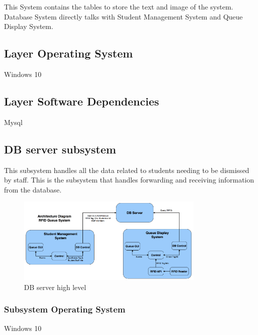 This System contains the tables to store the text and image of the system. Database System directly
talks with Student Management System and Queue Display System.


\subsection{Layer Operating System}
Windows 10

\subsection{Layer Software Dependencies}
Mysql

\subsection{DB server subsystem}
This subsystem handles all the data related to students needing to be dismissed by staff. This is the
subsystem that handles forwarding and receiving information from the database.

\begin{figure}[h!]
	\centering
 	\includegraphics[width=0.80\textwidth]{images/ads_2}
 \caption{DB server high level}
\end{figure}


\subsubsection{Subsystem Operating System}
Windows 10





